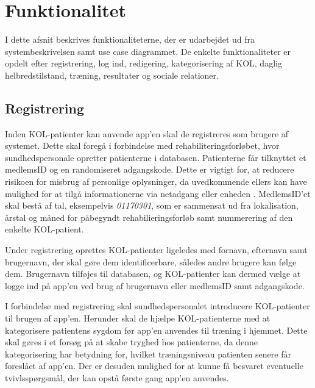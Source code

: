 \section{Funktionalitet}
I dette afsnit beskrives funktionaliteterne, der er udarbejdet ud fra systembeskrivelsen samt use case diagrammet. De enkelte funktionaliteter er opdelt efter registrering, log ind, redigering, kategorisering af KOL, daglig helbredstilstand, træning, resultater og sociale relationer. 

\subsection*{Registrering} \label{sec:registrering}
Inden KOL-patienter kan anvende app'en skal de registreres som brugere af systemet. Dette skal foregå i forbindelse med rehabiliteringsforløbet, hvor sundhedspersonale opretter patienterne i databasen. Patienterne får tilknyttet et medlemsID og en randomiseret adgangskode. Dette er vigtigt for, at reducere risikoen for misbrug af personlige oplysninger, da uvedkommende ellers kan have mulighed for at tilgå informationerne via netadgang eller enheden \cite{Sundhedsdatastyrelsen2016}. MedlemsID'et skal bestå af tal, eksempelvis \textit{01170301}, som er sammensat ud fra lokalisation, årstal og måned for påbegyndt rehabilieringsforløb samt nummerering af den enkelte KOL-patient.

Under registrering oprettes KOL-patienter ligeledes med fornavn, efternavn samt brugernavn, der skal gøre dem identificerbare, således andre brugere kan følge dem. Brugernavn tilføjes til databasen, og KOL-patienter kan dermed vælge at logge ind på app'en ved brug af brugernavn eller  medlemsID samt adgangskode. 

I forbindelse med registrering skal sundhedspersonalet introducere KOL-patienter til brugen af app'en. Herunder skal de hjælpe KOL-patienterne med at kategorisere patientens sygdom før app'en anvendes til træning i hjemmet. Dette skal gøres i et forsøg på at skabe tryghed hos patienterne, da denne kategorisering har betydning for, hvilket træningsniveau patienten senere får foreslået af app'en. Der er desuden mulighed for at kunne få besvaret eventuelle tvivlsspørgsmål, der kan opstå første gang app'en anvendes. 


